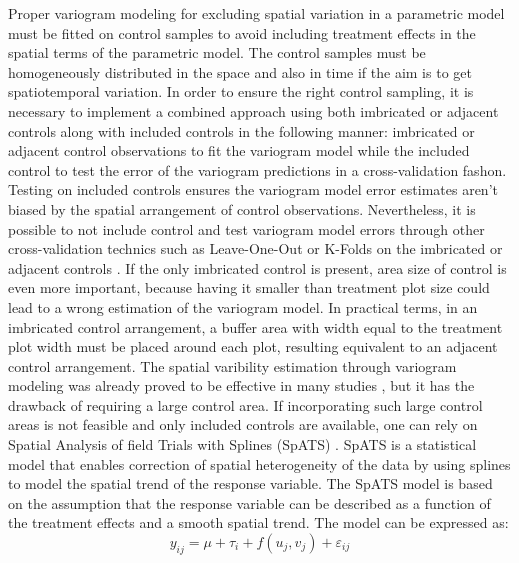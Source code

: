 \documentclass[12pt,a4paper,oneside]{report}
\begin{document}
Proper variogram modeling for excluding spatial variation in a parametric model
must be fitted on control samples \cite{larkOptimizedSpatialSampling2002, minasnyEfficiencyVariousApproaches2002}
to avoid including treatment effects in the 
spatial terms of the parametric model. 
The control samples must be homogeneously distributed
in the space and also in time if the aim is to get spatiotemporal variation.
In order to ensure the right control sampling, it is necessary to implement a 
combined approach using both imbricated or adjacent controls along with included 
controls in the following manner:
imbricated or adjacent control observations to fit the variogram model 
while the included control to test the error of the variogram predictions in a
cross-validation fashon. Testing on included controls ensures the variogram model 
error estimates aren't biased by the spatial arrangement of control observations. 
Nevertheless, it is possible to not include control and test variogram model errors
through other cross-validation technics such as Leave-One-Out or K-Folds on the 
imbricated or adjacent controls
\cite{websterGeostatisticsEnvironmentalScientists2007,henglPracticalGuideGeostatistical2007}. 
If the only imbricated control is present, area size of control is even 
more important, because having it smaller than treatment plot size could lead to a 
wrong estimation of the variogram model. In practical terms, in an imbricated control
arrangement, a buffer area with width equal to the treatment plot width must be placed around each plot,
resulting equivalent to an adjacent control arrangement. 
The spatial varibility estimation through variogram modeling was already proved 
to be effective in many studies \cite{bullockDataIntensiveFarmManagement2019,castrignanoGeostatisticalApproachModelling2017,jinEfficientGeostatisticalAnalysis2021,puntelLeveragingDigitalAgriculture2024,trevisanSpatialVariabilityCrop2021}, 
but it has the drawback of requiring a large control area. 
If incorporating such large control areas is not feasible and only included 
controls are available, 
one can rely on Spatial Analysis of field Trials with Splines (SpATS)
\cite{rodriguez-alvarezCorrectingSpatialHeterogeneity2018,rodriguez-alvarezFastSmoothingParameter2015,leeEfficientTwodimensionalSmoothing2013}.
SpATS is a statistical model that enables correction of spatial heterogeneity
of the data by using splines to model the spatial trend of the response variable.
The SpATS model is based on the assumption that the response variable can be
described as a function of the treatment effects and a smooth spatial trend.
The model can be expressed as:
\[
y_{ij} = \mu + \tau_i + f(u_j, v_j) + \varepsilon_{ij}
\]
\end{document}
